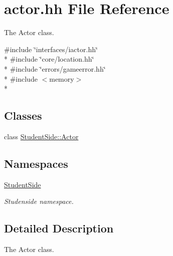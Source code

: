 \hypertarget{actor_8hh}{\section{actor.\-hh File Reference}
\label{actor_8hh}
}


The Actor class.  


{\ttfamily \#include \char`\"{}interfaces/iactor.\-hh\char`\"{}}\\*
{\ttfamily \#include \char`\"{}core/location.\-hh\char`\"{}}\\*
{\ttfamily \#include \char`\"{}errors/gameerror.\-hh\char`\"{}}\\*
{\ttfamily \#include $<$memory$>$}\\*
\subsection*{Classes}
\begin{DoxyCompactItemize}
\item 
class \hyperlink{class_student_side_1_1_actor}{Student\-Side\-::\-Actor}
\end{DoxyCompactItemize}
\subsection*{Namespaces}
\begin{DoxyCompactItemize}
\item 
\hyperlink{namespace_student_side}{Student\-Side}
\begin{DoxyCompactList}\small\item\em Studenside namespace. \end{DoxyCompactList}\end{DoxyCompactItemize}


\subsection{Detailed Description}
The Actor class. 